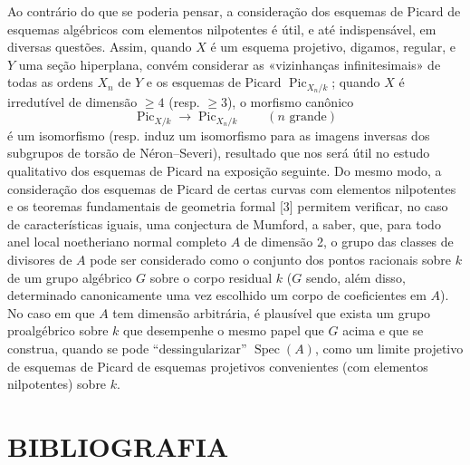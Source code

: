  Ao contrário do que se poderia pensar, a consideração
dos esquemas de Picard de esquemas algébricos com elementos nilpotentes é útil,
e até indispensável, em diversas questões. Assim, quando $X$ é um esquema
projetivo, digamos, regular, e $Y$ uma seção hiperplana, convém
considerar as «vizinhanças infinitesimais» de todas as ordens $X_n$ de $Y$ e os
esquemas de Picard $\operatorname{Pic}_{X_n/k}$; quando $X$ é irredutível de
dimensão $\geq4$ (resp. $\geq3$), o morfismo canônico
\[
\operatorname{Pic}_{X/k}\longrightarrow\operatorname{Pic}_{X_n/k}
\qquad(n\text{ grande})
\]
é um isomorfismo (resp. induz um isomorfismo para as imagens inversas dos
subgrupos de torsão de Néron--Severi), resultado que nos será útil no estudo
qualitativo dos esquemas de Picard na exposição seguinte. Do mesmo modo, a
consideração dos esquemas de Picard de certas curvas com elementos nilpotentes
e os teoremas fundamentais de geometria formal [3] permitem verificar, no caso
de características iguais, uma conjectura de Mumford, a saber, que, para todo
anel local noetheriano normal completo $A$ de dimensão 2, o grupo das classes
de divisores de $A$ pode ser considerado como o conjunto dos pontos racionais
sobre $k$ de um
grupo algébrico $G$ sobre o corpo residual $k$ ($G$ sendo, além disso,
determinado canonicamente uma vez escolhido um corpo de coeficientes em $A$).
No caso em que $A$ tem dimensão arbitrária, é plausível que exista um grupo
proalgébrico sobre $k$ que desempenhe o mesmo papel que $G$ acima e que se
construa, quando se pode ``dessingularizar'' $\operatorname{Spec}(A)$, como um
limite projetivo de esquemas de Picard de esquemas projetivos convenientes (com
elementos nilpotentes) sobre $k$.

\section*{BIBLIOGRAFIA}

